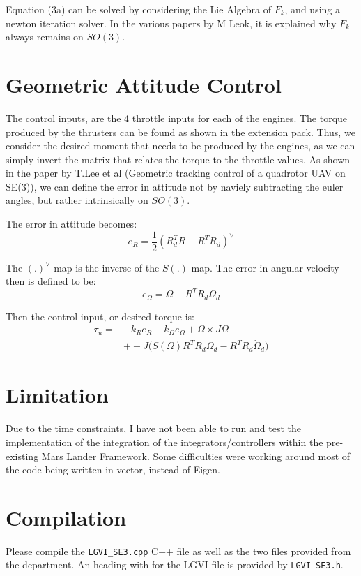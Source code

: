 \documentclass[letterpaper, 9 pt, conference]{ieeeconf}
\begin{document}
Equation (3a) can be solved by considering the Lie Algebra of $F_k$, and using a newton iteration solver. 
In the various papers by M Leok, it is explained why $F_k$ always remains on $SO(3)$. 

\section{Geometric Attitude Control}
The control inputs, are the 4 throttle inputs for each of the engines. The torque produced by the thrusters 
can be found as shown in the extension pack. Thus, we consider the desired moment that needs to be produced by the engines, 
as we can simply invert the matrix that relates the torque to the throttle values. 
As shown in the paper by T.Lee et al (Geometric tracking control of a quadrotor UAV on SE(3)), 
we can define the error in attitude not by naviely subtracting the euler angles, but rather intrinsically on $SO(3)$.

The error in attitude becomes:
\begin{equation}
    e_R = \frac{1}{2} \left(R_d ^T R -  R^T R_d \right)^{\vee}
\end{equation}

The $(.)^{\vee}$ map is the inverse of the $S(.)$ map. 
The error in angular velocity then is defined to be: 
\begin{equation}
    e_{\Omega} = \Omega - R^T R_d \Omega_d
\end{equation}

Then the control input, or desired torque is: 
\begin{equation}
\begin{aligned}
\tau_u = &-k_R e_R - k_{\Omega} e_{\Omega} + \Omega \times J \Omega \\
       &+ - J \big( S(\Omega) R^{T} R_{d} \Omega_{d} - R^{T} R_{d} \dot{\Omega}_{d} \big)
\end{aligned}
\end{equation}

\section{Limitation}
Due to the time constraints, I have not been able to run and test the implementation of the integration of the 
integrators/controllers within the pre-existing Mars Lander Framework. 
Some difficulties were working around most of the code being written in vector, instead of Eigen. 

\section{Compilation}
Please compile the \texttt{LGVI\_SE3.cpp} C++ file as well as the two files provided from the department.
An heading with for the LGVI file is provided by \texttt{LGVI\_SE3.h}. 
\end{document}
